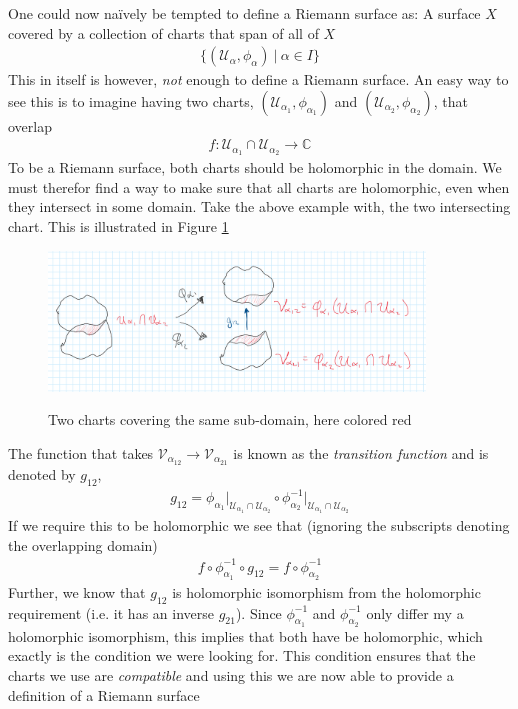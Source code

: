 \documentclass[lettersize,11pt]{article}
\begin{document}
One could now naïvely be tempted to define a Riemann surface as: A surface $X$ covered by a collection of charts that span of all of $X$
\begin{equation}
	\begin{aligned}
		\{(\mathcal{U}_\alpha,\phi_\alpha)~\big|~\alpha\in I\}
	\end{aligned}
\end{equation}
This in itself is however, \textit{not} enough to define a Riemann surface. An easy way to see this is to imagine having two charts, $(\mathcal{U}_{\alpha_1},\phi_{\alpha_1})$ and $(\mathcal{U}_{\alpha_2},\phi_{\alpha_2})$, that overlap
\begin{equation}
	\begin{aligned}
		f:\mathcal{U}_{\alpha_1}\cap \mathcal{U}_{\alpha_2}\to \mathds{C}
	\end{aligned}
\end{equation}
To be a Riemann surface, both charts should be holomorphic in the domain. We must therefor find a way to make sure that all charts are holomorphic, even when they intersect in some domain. Take the above example with, the two intersecting chart. This is illustrated in Figure \ref{fig:trans}
\begin{figure}[H]\centering
	\includegraphics[width=10cm]{5} \label{fig:trans} \caption{Two charts covering the same sub-domain, here colored red}
\end{figure}
The function that takes $\mathcal{V}_{\alpha_{12}}\to \mathcal{V}_{\alpha_{21}}$ is known as the \textit{transition function} and is denoted by $g_{12}$,
\begin{equation}
	\begin{aligned}
		g_{12}=\phi_{\alpha_1}\big|_{\mathcal{U}_{\alpha_1}\cap \mathcal{U}_{\alpha_2}}\circ \phi_{\alpha_2}^{-1}\big|_{\mathcal{U}_{\alpha_1}\cap \mathcal{U}_{\alpha_2}}
	\end{aligned}
\end{equation}
If we require this to be holomorphic we see that (ignoring the subscripts denoting the overlapping domain)
\begin{equation}
	\begin{aligned}
		f\circ \phi_{\alpha_1}^{-1}\circ g_{12}=f\circ \phi_{\alpha_2}^{-1}
	\end{aligned}
\end{equation}
Further, we know that $g_{12}$ is holomorphic isomorphism from the holomorphic requirement (i.e. it has an inverse $g_{21}$). Since
$\phi^{-1}_{\alpha_1}$ and $\phi^{-1}_{\alpha_2}$ only differ my a holomorphic isomorphism, this implies that both have be holomorphic, which exactly is the condition we were looking for. This condition ensures that the charts we use are \textit{compatible} and using this we are now able to provide a definition of a Riemann surface
\end{document}
